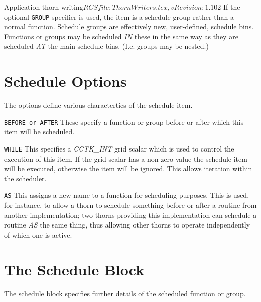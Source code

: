 \begin{cactuspart}{2}{Application thorn writing}{$RCSfile: ThornWriters.tex,v $}{$Revision: 1.102 $}
If the optional {\tt GROUP} specifier is used, the item is a schedule
group rather than a normal function.  Schedule groups are effectively
new, user-defined, schedule bins.  Functions or groups may be
scheduled {\em IN} these in the same way as they are scheduled {\em
AT} the main schedule bins.  (I.e. groups may be nested.)

\section{Schedule Options}
\label{scheduling:schedule_options}
The options define various charactertics of the schedule item.

\begin{Lentry}
\item[{\tt BEFORE or AFTER}]
These specify a function or group before or after which this item will
be scheduled.
\item[{\tt WHILE}]
This specifies a {\em CCTK\_INT} grid scalar which is used to control
the execution of this item.  If the grid scalar has a non-zero value
the schedule item will be executed, otherwise the item will be
ignored.  This allows iteration within the scheduler.
\item[{\tt AS}]
This assigns a new name to a function for scheduling purposes.  This
is used, for instance, to allow a thorn to schedule something before
or after a routine from another implementation;  two thorns providing this
implementation can schedule a routine {\em AS} the same thing, thus
allowing other thorns to operate independently of which one is active.
\end{Lentry}

\section{The Schedule Block}
\label{scheduling:schedule_block}

The schedule block specifies further details of the scheduled function
or group.


\end{cactuspart}
